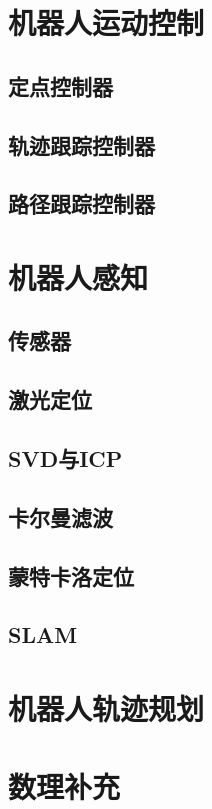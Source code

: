 \documentclass[
12pt, %
a4paper, 
oneside, %
headinclude,footinclude, %
]{scrartcl}
\begin{document}
\section{机器人运动控制}
\subsection{定点控制器}
\subsection{轨迹跟踪控制器}
\subsection{路径跟踪控制器}
\section{机器人感知}
\subsection{传感器}
\subsection{激光定位}
\subsection{SVD与ICP}
\subsection{卡尔曼滤波}
\subsection{蒙特卡洛定位}
\subsection{SLAM}
\section{机器人轨迹规划}
\section{数理补充}
\end{document}
